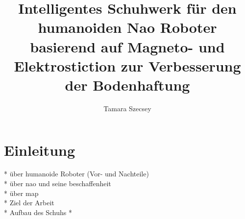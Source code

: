 \documentclass[a4paper,
DIV=13,
12pt,
BCOR=10mm,
department=FakEI,
twoside,
parskip=half,
automark,
]{OTHRartcl}
\title{Intelligentes Schuhwerk für den humanoiden Nao Roboter basierend auf Magneto- und Elektrostiction zur Verbesserung der Bodenhaftung}
\author{Tamara Szecsey}
\begin{document}
	\maketitle
\makedeclaration
\thispagestyle{empty}
\tableofcontents	
\clearpage	
\setcounter{page}{1}
%
%
\section{Einleitung}
* über humanoide Roboter (Vor- und Nachteile) \\
* über nao und seine beschaffenheit \\
* über map \\
* Ziel der Arbeit \\

* Aufbau des Schuhs
* 
%
%
%
%
%
%
%
%
%
%
%

\FloatBarrier
\newpage
\clearpage	
\thispagestyle{empty}
\printbibliography
\end{document}
